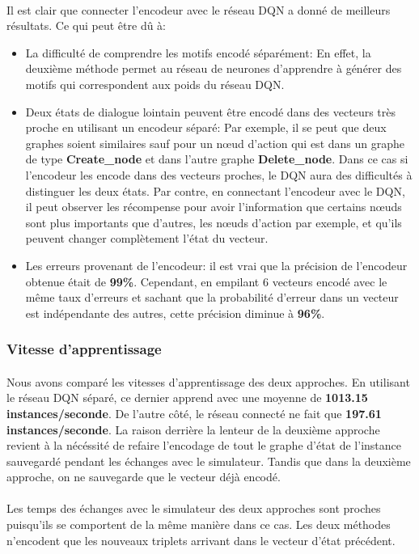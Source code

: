 \paragraph{}Il est clair que connecter l'encodeur avec le réseau DQN a donné de meilleurs résultats. Ce qui peut être dû à:
\begin{itemize}
	\item La difficulté de comprendre les motifs encodé séparément: En effet, la deuxième méthode permet au réseau de neurones d'apprendre à générer des motifs qui correspondent aux poids du réseau DQN.
	\item Deux états de dialogue lointain peuvent être encodé dans des vecteurs très proche en utilisant un encodeur séparé: Par exemple, il se peut que deux graphes soient similaires sauf pour un n\oe{}ud d'action qui est dans un graphe de type \textbf{Create\_node} et dans l'autre graphe \textbf{Delete\_node}. Dans ce cas si l'encodeur les encode dans des vecteurs proches, le DQN aura des difficultés à distinguer les deux états. Par contre, en connectant l'encodeur avec le DQN, il peut observer les récompense pour avoir l'information que certains n\oe{}uds sont plus importants que d'autres, les n\oe{}uds d'action par exemple, et qu'ils peuvent changer complètement l'état du vecteur.
	\item Les erreurs provenant de l'encodeur: il est vrai que la précision de l'encodeur obtenue était de \textbf{99\%}. Cependant, en empilant 6 vecteurs encodé avec le même taux d'erreurs et sachant que la probabilité d'erreur dans un vecteur est indépendante des autres, cette précision diminue à \textbf{96\%}.
\end{itemize}
\subsubsection{Vitesse d'apprentissage}
\paragraph{}Nous avons comparé les vitesses d'apprentissage des deux approches. En utilisant le réseau DQN séparé, ce dernier apprend avec une moyenne de \textbf{1013.15 instances/seconde}. De l'autre côté, le réseau connecté ne fait que \textbf{197.61 instances/seconde}. La raison derrière la lenteur de la deuxième approche revient à la nécéssité de refaire l'encodage de tout le graphe d'état de l'instance sauvegardé pendant les échanges avec le simulateur. Tandis que dans la deuxième approche, on ne sauvegarde que le vecteur déjà encodé.\\\\
Les temps des échanges avec le simulateur des deux approches sont proches puisqu'ils se comportent de la même manière dans ce cas. Les deux méthodes n'encodent que les nouveaux triplets arrivant dans le vecteur d'état précédent. 
